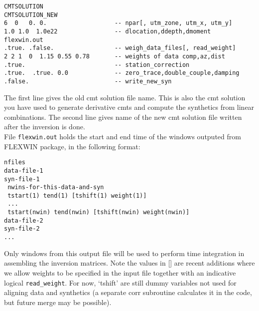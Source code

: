 \documentclass[12pt,titlepage,fleqn]{article}
\begin{document}
\begin{verbatim}
CMTSOLUTION
CMTSOLUTION_NEW
6  0   0. 0.                   -- npar[, utm_zone, utm_x, utm_y]
1.0 1.0  1.0e22                -- dlocation,ddepth,dmoment
flexwin.out
.true. .false.                 -- weigh_data_files[, read_weight]
2 2 1  0  1.15 0.55 0.78       -- weights of data comp,az,dist
.true.                         -- station_correction
.true.  .true. 0.0             -- zero_trace,double_couple,damping
.false.                        -- write_new_syn
\end{verbatim}
The first line gives the old cmt solution file name. This is also the cmt solution you have used to generate derivative cmts and compute the synthetics from linear combinations. The second line gives name of the new cmt solution file written after the inversion is done.\\
File \verb=flexwin.out= holds the start and end time of the windows outputed from FLEXWIN package, in the following format:
\begin{verbatim}
nfiles
data-file-1
syn-file-1
 nwins-for-this-data-and-syn
 tstart(1) tend(1) [tshift(1) weight(1)]
 ...
 tstart(nwin) tend(nwin) [tshift(nwin) weight(nwin)]
data-file-2
syn-file-2
...
\end{verbatim}
Only windows from this output file will be used to perform time integration in assembling the inversion matrices. Note the values in [] are recent additions where we allow weights to be specified in the input file together with an indicative logical \verb+read_weight+. For now, `tshift' are still dummy variables not used for aligning data and synthetics (a separate corr subroutine calculates it in the code, but future merge may be possible).
\end{document}
